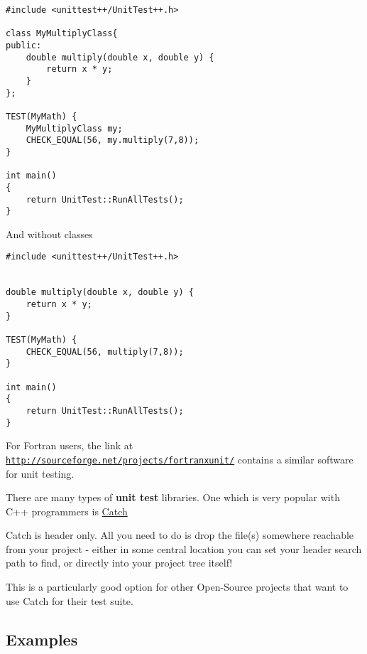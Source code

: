 \documentclass[%
oneside,                 %
final,                   %
10pt]{article}
\begin{document}
\begin{verbatim}
#include <unittest++/UnitTest++.h>

class MyMultiplyClass{
public:
    double multiply(double x, double y) {
        return x * y;
    }
};

TEST(MyMath) {
    MyMultiplyClass my;
    CHECK_EQUAL(56, my.multiply(7,8));
}

int main()
{
    return UnitTest::RunAllTests();
}

\end{verbatim}


And without classes
















\begin{verbatim}
#include <unittest++/UnitTest++.h>


double multiply(double x, double y) {
    return x * y;
}

TEST(MyMath) {
    CHECK_EQUAL(56, multiply(7,8));
}

int main()
{
    return UnitTest::RunAllTests();
} 

\end{verbatim}

For Fortran users, the link at \href{{http://sourceforge.net/projects/fortranxunit/}}{\nolinkurl{http://sourceforge.net/projects/fortranxunit/}} contains a similar
software for unit testing. 

There are many types of \textbf{unit test} libraries. One which is very popular with C++ programmers is \href{{https://github.com/philsquared/Catch/blob/master/docs/tutorial.md}}{Catch}

Catch is header only. All you need to do is drop the file(s) somewhere reachable from your project - either in some central location you can set your header search path to find, or directly into your project tree itself! 

This is a particularly good option for other Open-Source projects that want to use Catch for their test suite.

\subsection*{Examples}
\end{document}
